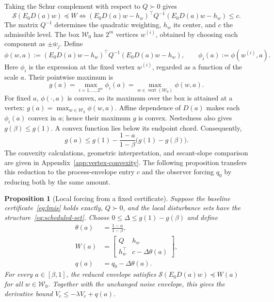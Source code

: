 \documentclass[11pt,a4paper]{article}
\numberwithin{equation}{section}
\newtheorem{proposition}{Proposition}
\theoremstyle{remark}\newtheorem{remark}{Remark}
\newcommand{\cW}{\mathcal W}
\begin{document}
Taking the Schur complement with respect to $Q\succ0$ gives
\begin{equation}\label{eq:schur}
\mathcal S(E_0D(a)w)\preceq W
\iff (E_0D(a)w-h_w)^\top Q^{-1}(E_0D(a)w-h_w)\le c.
\end{equation}
The matrix $Q^{-1}$ determines the quadratic weighting, $h_w$ its center, and $c$ the admissible level. The box $\cW_0$ has $2^m$ vertices $w^{(i)}$, obtained by choosing each component as $\pm\bar w_j$. Define
\[
\phi(w,a):=(E_0D(a)w-h_w)^\top Q^{-1}(E_0D(a)w-h_w),
\qquad \phi_i(a):=\phi(w^{(i)},a).
\]
Here $\phi_i$ is the expression at the fixed vertex $w^{(i)}$, regarded as a function of the scale $a$. Their pointwise maximum is
\begin{equation}\label{eq:vertex-maximum}
g(a)=\max_{i=1,\ldots,2^m}\phi_i(a)
=\max_{w\in\operatorname{vert}(\cW_0)}\phi(w,a).
\end{equation}
For fixed $a$, $\phi(\cdot,a)$ is convex, so its maximum over the box is attained at a vertex:
$g(a)=\max_{w\in\cW_0}\phi(w,a)$. Affine dependence of $D(a)$ makes each $\phi_i(a)$ convex in $a$; hence their maximum $g$ is convex. Nestedness also gives $g(\beta)\le g(1)$.
A convex function lies below its endpoint chord. Consequently,
\begin{equation}\label{eq:chord}
g(a)\le g(1)-\frac{1-a}{1-\beta}\bigl(g(1)-g(\beta)\bigr).
\end{equation}
The convexity calculations, geometric interpretation, and secant-slope comparison are given in Appendix~\ref{app:vertex-convexity}. The following proposition transfers this reduction to the process-envelope entry $c$ and the observer forcing $q_0$ by reducing both by the same amount.
\begin{proposition}[Local forcing from a fixed certificate]\label{prop:local}
Suppose the baseline certificate~\eqref{eq:lmis} holds exactly, $Q\succ0$, and the local disturbance sets have the structure~\eqref{eq:scheduled-set}. Choose
$0\le\Delta\le g(1)-g(\beta)$ and define
\begin{align}
\theta(a)&=\frac{1-a}{1-\beta},\\
W(a)&=\begin{bmatrix}Q&h_w\\h_w^\top&c-\Delta\theta(a)\end{bmatrix},\\
q(a)&=q_0-\Delta\theta(a).\label{eq:q}
\end{align}
For every $a\in[\beta,1]$, the reduced envelope satisfies $\mathcal S(E_0D(a)w)\preceq W(a)$ for all $w\in\cW_0$. Together with the unchanged noise envelope, this gives the derivative bound
$\dot V_e\le-\lambda V_e+q(a)$.
\end{proposition}
\end{document}
